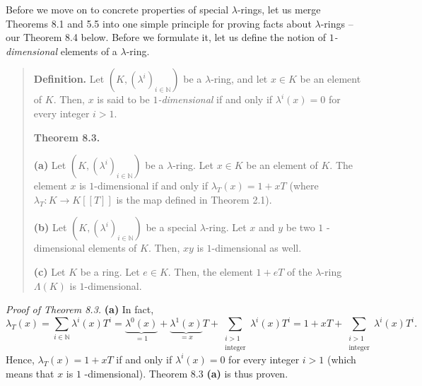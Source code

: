 \documentclass[numbers=enddot,12pt,final,onecolumn,notitlepage]{scrartcl}%
\begin{document}
Before we move on to concrete properties of special $\lambda$-rings, let us
merge Theorems 8.1 and 5.5 into one simple principle for proving facts about
$\lambda$-rings -- our Theorem 8.4 below. Before we formulate it, let us
define the notion of $1$\textit{-dimensional} elements of a $\lambda$-ring.

\begin{quote}
\textbf{Definition.} Let $\left(  K,\left(  \lambda^{i}\right)  _{i\in
\mathbb{N}}\right)  $ be a $\lambda$-ring, and let $x\in K$ be an element of
$K$. Then, $x$ is said to be $1$\textit{-dimensional} if and only if
$\lambda^{i}\left(  x\right)  =0$ for every integer $i>1$.

\textbf{Theorem 8.3.}

\textbf{(a)} Let $\left(  K,\left(  \lambda^{i}\right)  _{i\in\mathbb{N}%
}\right)  $ be a $\lambda$-ring. Let $x\in K$ be an element of $K$. The
element $x$ is $1$-dimensional if and only if $\lambda_{T}\left(  x\right)
=1+xT$ (where $\lambda_{T}:K\rightarrow K\left[  \left[  T\right]  \right]  $
is the map defined in Theorem 2.1).

\textbf{(b)} Let $\left(  K,\left(  \lambda^{i}\right)  _{i\in\mathbb{N}%
}\right)  $ be a special $\lambda$-ring. Let $x$ and $y$ be two $1$%
-dimensional elements of $K$. Then, $xy$ is $1$-dimensional as well.

\textbf{(c)} Let $K$ be a ring. Let $e\in K$. Then, the element $1+eT$ of the
$\lambda$-ring $\Lambda\left(  K\right)  $ is $1$-dimensional.
\end{quote}

\textit{Proof of Theorem 8.3.} \textbf{(a)} In fact,%
\[
\lambda_{T}\left(  x\right)  =\sum\limits_{i\in\mathbb{N}}\lambda^{i}\left(
x\right)  T^{i}=\underbrace{\lambda^{0}\left(  x\right)  }_{=1}%
+\underbrace{\lambda^{1}\left(  x\right)  }_{=x}T+\sum
\limits_{\substack{i>1\\\text{integer}}}\lambda^{i}\left(  x\right)
T^{i}=1+xT+\sum\limits_{\substack{i>1\\\text{integer}}}\lambda^{i}\left(
x\right)  T^{i}.
\]
Hence, $\lambda_{T}\left(  x\right)  =1+xT$ if and only if $\lambda^{i}\left(
x\right)  =0$ for every integer $i>1$ (which means that $x$ is $1$%
-dimensional). Theorem 8.3 \textbf{(a)} is thus proven.
\end{document}
